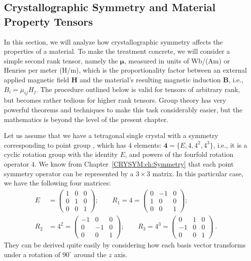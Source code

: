 \subsection{Crystallographic Symmetry and Material Property Tensors}\label{\chabbr:ssec:propsym}

In this section, we will analyze how crystallographic symmetry affects the properties of a material.  To make the treatment concrete, we will consider a simple second rank tensor, namely the  $\bm{\mu}$, measured in units of Wb/(Am) or Henries per meter (H/m), which is the proportionality factor between an external applied magnetic field $\mathbf{H}$ and the material's resulting magnetic induction $\mathbf{B}$, i.e., $B_i=\mu_{ij}H_j$.  The procedure outlined below is valid for tensors of arbitrary rank, but becomes rather tedious for higher rank tensors. Group theory has very powerful theorems and techniques to make this task considerably easier, but the mathematics is beyond the level of the present chapter.

Let us assume that we have a tetragonal single crystal with a symmetry corresponding to point group , which has $4$ elements: $\textbf{4} = \{E,4,4^2,4^3\}$, i.e., it is a cyclic rotation group with the identity $E$, and powers of the fourfold rotation operator $4$. We know from Chapter~\ref{CRYSYM:ch:Symmetry} that each point symmetry operator can be represented by a $3\times 3$ matrix.  In this particular case, we have the following four matrices:
\begin{align}
E &= \begin{pmatrix}1&0&0\\ 0&1&0\\ 0&0&1\end{pmatrix}; \qquad R_1 = 4 = \begin{pmatrix}0&-1&0\\ 1&0&0\\ 0&0&1\end{pmatrix};\nonumber\\
R_2 &= 4^2= \begin{pmatrix}-1&0&0\\ 0&-1&0\\ 0&0&1\end{pmatrix}; \qquad R_3 = 4^3 = \begin{pmatrix}0&1&0\\ -1&0&0\\ 0&0&1\end{pmatrix}\ .
\end{align}
They can be derived quite easily by considering how each basis vector transforms under a rotation of $90^{\circ}$ around the $z$ axis.

